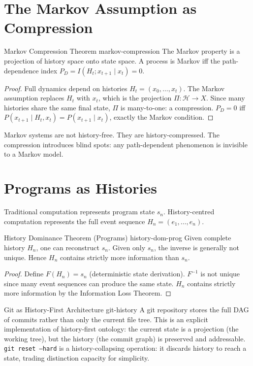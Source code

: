 \documentclass[12pt,twoside,openright]{book}
\newcommand{\csicon} {\marginpar{\tiny\color{DistBlue}\faCode}}
\newcommand{\hist}{\mathcal{H}}
\begin{document}
\section{The Markov Assumption as Compression}
\label{sec:ch4-markov}

\begin{theorem}{Markov Compression Theorem}%
  {markov-compression}
  The Markov property is a projection of history space
  onto state space. A process is Markov iff the
  path-dependence index
  $P_D = I(H_t; x_{t+1} \mid x_t) = 0$.
\end{theorem}

\begin{proof}
  Full dynamics depend on histories
  $H_t = (x_0,\ldots,x_t)$. The Markov assumption
  replaces $H_t$ with $x_t$, which is the projection
  $\Pi: \hist \to X$. Since many histories share the
  same final state, $\Pi$ is many-to-one: a compression.
  $P_D = 0$ iff $P(x_{t+1} \mid H_t, x_t)
  = P(x_{t+1} \mid x_t)$, exactly the Markov condition.
\end{proof}

Markov systems are not history-free. They are
history-compressed. The compression introduces blind spots:
any path-dependent phenomenon is invisible to a Markov
model.

\section{Programs as Histories}
\label{sec:ch4-programs}

\csicon
Traditional computation represents program state $s_n$.
History-centred computation represents the full event
sequence $H_n = (e_1, \ldots, e_n)$.

\begin{theorem}{History Dominance Theorem (Programs)}%
  {history-dom-prog}
  Given complete history $H_n$, one can reconstruct $s_n$.
  Given only $s_n$, the inverse is generally not unique.
  Hence $H_n$ contains strictly more information than $s_n$.
\end{theorem}

\begin{proof}
  Define $F(H_n) = s_n$ (deterministic state derivation).
  $F^{-1}$ is not unique since many event sequences can
  produce the same state. $H_n$ contains strictly more
  information by the Information Loss Theorem.
\end{proof}

\begin{example}{Git as History-First Architecture}%
  {git-history}
  \csicon
  A git repository stores the full DAG of commits rather
  than only the current file tree. This is an explicit
  implementation of history-first ontology: the current
  state is a projection (the working tree), but the
  history (the commit graph) is preserved and addressable.
  \texttt{git reset --hard} is a history-collapsing
  operation: it discards history to reach a state,
  trading distinction capacity for simplicity.
\end{example}
\end{document}
